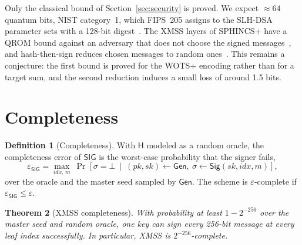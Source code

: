 \documentclass[11pt]{article}
\theoremstyle{definition}
\newtheorem{definition}{Definition}[section]
\theoremstyle{plain}
\newtheorem{theorem}[definition]{Theorem}
\theoremstyle{remark}
\newcommand{\Gen}{\mathsf{Gen}}
\newcommand{\Sig}{\mathsf{Sig}}
\newcommand{\SIG}{\mathsf{SIG}}
\newcommand{\hash}{\mathsf{H}}
\newcommand{\idx}{\mathit{idx}}
\newcommand{\sk}{\mathit{sk}}
\newcommand{\pk}{\mathit{pk}}
\begin{document}
Only the classical bound of Section~\ref{sec:security} is proved. We expect $\approx64$ quantum bits, NIST category~1, which FIPS~205 assigns to the SLH-DSA parameter sets with a 128-bit digest~\cite{FIPS205}. The XMSS layers of SPHINCS+ have a QROM bound against an adversary that does not choose the signed messages~\cite{HK22}, and hash-then-sign reduces chosen messages to random ones~\cite{GHHM21}. This remains a conjecture: the first bound is proved for the WOTS+ encoding rather than for a target sum, and the second reduction induces a small loss of around 1.5 bits.

\section{Completeness}

\begin{definition}[Completeness]
With $\hash$ modeled as a random oracle, the completeness error of $\SIG$ is the worst-case probability that the signer fails,
\[
  \varepsilon_{\SIG}=\max_{\idx,\,m}\ \Pr\!\left[\sigma=\bot\ \middle|\ (\pk,\sk)\gets\Gen,\ \sigma\gets\Sig(\sk,\idx,m)\right],
\]
over the oracle and the master seed sampled by $\Gen$. The scheme is $\varepsilon$-complete if $\varepsilon_{\SIG}\leq\varepsilon$.
\end{definition}

\begin{theorem}[XMSS completeness]
With probability at least $1-2^{-256}$ over the master seed and random oracle, one key can sign every 256-bit message at every leaf index successfully. In particular, XMSS is $2^{-256}$-complete.
\end{theorem}
\end{document}
